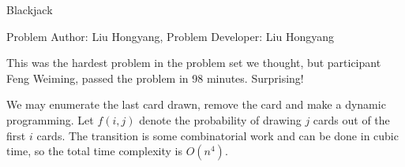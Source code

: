 \begin{Solution}{Blackjack}

\begin{frame}{\ProblemName}

\small Problem Author: Liu Hongyang, Problem Developer: Liu Hongyang \par \vspace{0.3cm}

This was the hardest problem in the problem set we thought, but participant Feng Weiming, passed the problem in 98 minutes. Surprising!

We may enumerate the last card drawn, remove the card and make a dynamic programming. Let $f(i, j)$ denote the probability of drawing $j$ cards out of the first $i$ cards. The transition is some combinatorial work and can be done in cubic time, so the total time complexity is $O(n^4)$.

\end{frame}

\end{Solution}
